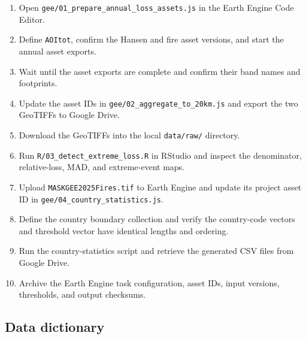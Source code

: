 \documentclass[
]{article}
\providecommand{\tightlist}{%
  \setlength{\itemsep}{0pt}\setlength{\parskip}{0pt}}
\begin{document}
\begin{enumerate}
\def\labelenumi{\arabic{enumi}.}
\tightlist
\item
  Open \texttt{gee/01\_prepare\_annual\_loss\_assets.js} in the Earth
  Engine Code Editor.
\item
  Define \texttt{AOItot}, confirm the Hansen and fire asset versions,
  and start the annual asset exports.
\item
  Wait until the asset exports are complete and confirm their band names
  and footprints.
\item
  Update the asset IDs in \texttt{gee/02\_aggregate\_to\_20km.js} and
  export the two GeoTIFFs to Google Drive.
\item
  Download the GeoTIFFs into the local \texttt{data/raw/} directory.
\item
  Run \texttt{R/03\_detect\_extreme\_loss.R} in RStudio and inspect the
  denominator, relative-loss, MAD, and extreme-event maps.
\item
  Upload \texttt{MASKGEE2025Fires.tif} to Earth Engine and update its
  project asset ID in \texttt{gee/04\_country\_statistics.js}.
\item
  Define the country boundary collection and verify the country-code
  vectors and threshold vector have identical lengths and ordering.
\item
  Run the country-statistics script and retrieve the generated CSV files
  from Google Drive.
\item
  Archive the Earth Engine task configuration, asset IDs, input
  versions, thresholds, and output checksums.
\end{enumerate}

\subsection{Data dictionary}\label{data-dictionary}
\end{document}
